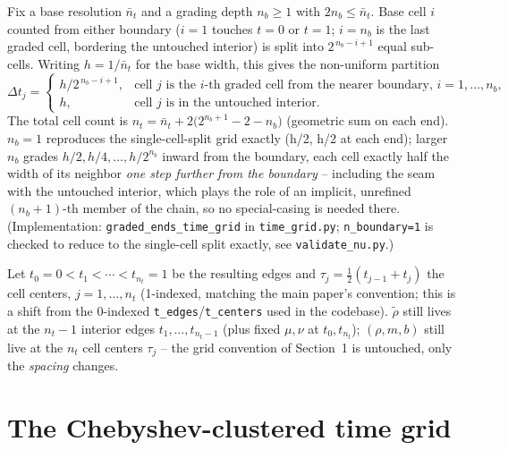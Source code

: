 \documentclass[11pt]{article}
\newcommand{\dt}{\Delta t}
\newcommand{\code}[1]{\texttt{#1}}
\begin{document}
Fix a base resolution $\bar n_t$ and a grading depth $n_b\ge 1$ with $2n_b\le\bar n_t$. Base cell
$i$ counted from either boundary ($i=1$ touches $t=0$ or $t=1$; $i=n_b$ is the last graded cell,
bordering the untouched interior) is split into $2^{\,n_b-i+1}$ equal sub-cells. Writing
$h=1/\bar n_t$ for the base width, this gives the non-uniform partition
\begin{equation}
  \dt_j =
  \begin{cases}
    h/2^{\,n_b-i+1}, & \text{cell $j$ is the $i$-th graded cell from the nearer boundary,
                              $i=1,\dots,n_b$}, \\
    h, & \text{cell $j$ is in the untouched interior.}
  \end{cases}
\end{equation}
The total cell count is $n_t = \bar n_t + 2\bigl(2^{n_b+1}-2-n_b\bigr)$ (geometric sum on each
end). $n_b=1$ reproduces the single-cell-split grid exactly (h/2, h/2 at each end); larger $n_b$
grades $h/2, h/4, \dots, h/2^{n_b}$ inward from the boundary, each cell exactly half the width of
its neighbor \emph{one step further from the boundary} -- including the seam with the untouched
interior, which plays the role of an implicit, unrefined $(n_b{+}1)$-th member of the chain, so
no special-casing is needed there. (Implementation: \code{graded\_ends\_time\_grid} in
\code{time\_grid.py}; \code{n\_boundary=1} is checked to reduce to the single-cell split exactly,
see \code{validate\_nu.py}.)

Let $t_0=0<t_1<\cdots<t_{n_t}=1$ be the resulting edges and $\tau_j=\tfrac12(t_{j-1}+t_j)$ the
cell centers, $j=1,\dots,n_t$ (1-indexed, matching the main paper's convention; this is a shift
from the 0-indexed \code{t\_edges}/\code{t\_centers} used in the codebase). $\tilde\rho$ still
lives at the $n_t-1$ interior edges $t_1,\dots,t_{n_t-1}$ (plus fixed $\mu,\nu$ at $t_0,t_{n_t}$);
$(\rho,m,b)$ still live at the $n_t$ cell centers $\tau_j$ -- the grid convention of
Section~1 is untouched, only the \emph{spacing} changes.

\section{The Chebyshev-clustered time grid}
\label{sec:cheb-grid}
\end{document}
